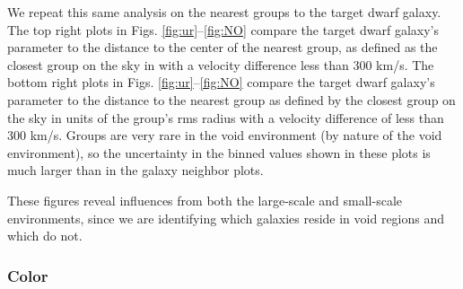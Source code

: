 We repeat this same analysis on the nearest groups to the target dwarf galaxy.  
The top right plots in Figs. \ref{fig:ur}--\ref{fig:NO} compare the target dwarf 
galaxy's parameter to the distance to the center of the nearest group, as 
defined as the closest group on the sky in \hMpc with a velocity difference less 
than 300 km/s.  The bottom right plots in Figs. \ref{fig:ur}--\ref{fig:NO} 
compare the target dwarf galaxy's parameter to the distance to the nearest group 
as defined by the closest group on the sky in units of the group's rms radius 
with a velocity difference of less than 300 km/s.  Groups are very rare in the 
void environment (by nature of the void environment), so the uncertainty in the 
binned values shown in these plots is much larger than in the galaxy neighbor 
plots.

These figures reveal influences from both the large-scale and small-scale 
environments, since we are identifying which galaxies reside in void regions and 
which do not.


\subsubsection{Color}

